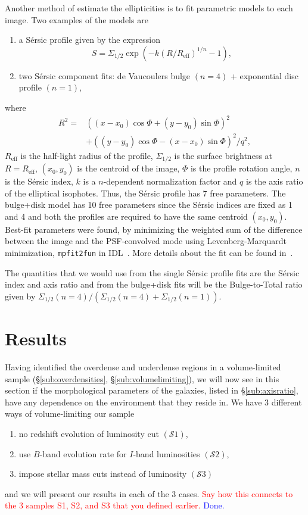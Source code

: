 \documentclass[twocolumn,useAMS,usenatbib]{mn2e}
\newcommand{\rachel}[1]{{\textcolor{red}{#1}}}
\newcommand{\arun}[1]{{\textcolor{blue}{#1}}}
\newcommand{\sersic}{S\'{e}rsic }
\newcommand{\btt}{Bulge-to-Total }
\newcommand{\s}{\ensuremath{\mathcal{S}}}
\begin{document}
Another method of estimate the ellipticities is to fit parametric models to each image. Two examples of the models are
\begin{enumerate}
 \item a \sersic profile given by the expression 
       \begin{equation} 
    S = \Sigma_{1/2}\exp{\left( -k(R/R_{\text{eff}})^{1/n} -1 \right)},
       \end{equation}
       \item two \sersic component fits: de Vaucoulers bulge $(n=4)$ + exponential disc profile $(n=1)$,
\end{enumerate}
where \begin{align*} R^2 = & ((x-x_0)\cos\Phi+(y-y_0)\sin\Phi)^2  \\ & + ((y-y_0)\cos\Phi-(x-x_0)\sin\Phi)^2/q^2, \end{align*}
$R_{\text{eff}}$ is the half-light radius of the profile, $\Sigma_{1/2}$ is the surface brightness at $R=R_{\text{eff}}$, $(x_0,y_0)$ is the centroid of the image,
$\Phi$ is the profile rotation angle, $n$ is the \sersic index, $k$ is a $n$-dependent normalization factor and $q$ is the axis ratio of the elliptical isophotes.
Thus, the \sersic profile has 7 free parameters. The bulge+disk model has 10 free parameters since the \sersic indices are fixed as 1 and 4
and both the profiles are required to have the same centroid $(x_0,y_0)$. Best-fit parameters were found, by minimizing the weighted
sum of the difference between the image and the PSF-convolved mode
using Levenberg-Marquardt minimization, \texttt{mpfit2fun} in IDL~\citep{mpfit2fun}. More details about the fit can be found
in~\cite{Claire_Fits}.

The quantities that we would use from the single \sersic profile fits are the \sersic index and axis ratio
and from the bulge+disk fits will be the \btt ratio given by ${\Sigma_{1/2}(n=4)}/{\left(\Sigma_{1/2}(n=4)+\Sigma_{1/2}(n=1)\right)}$.

\section{Results}
\label{S:results}
Having identified the overdense and underdense regions in a volume-limited sample (\S\ref{sub:overdensities}, \S\ref{sub:volumelimiting}), we will now see in this section if the morphological
parameters of the galaxies, listed in \S\ref{sub:axisratio}, have any dependence on the environment that they reside in. We have 3 different ways of volume-limiting our sample
\begin{enumerate}
 \item no redshift evolution of luminosity cut $(\s1)$,
 \item use $B$-band evolution rate for $I$-band luminosities $(\s2)$,
 \item impose stellar mass cuts instead of luminosity $(\s3)$
\end{enumerate}
and we will present our results in each of the 3 cases. 
\rachel{Say how this connects to the 3 samples S1, S2, and S3 that you defined earlier.} \arun{Done.}
\end{document}
